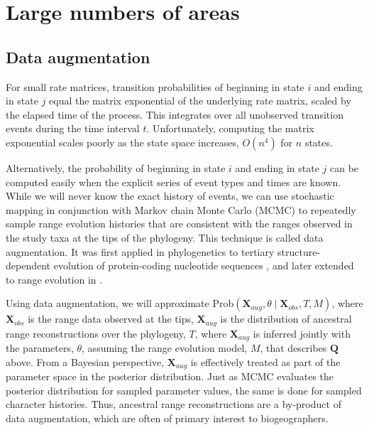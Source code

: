 \section{Large numbers of areas}
\label{sec:bayarea}

\setlength{\parindent}{0pt}

\subsection{Data augmentation}
\label{sec:data_aug}

For small rate matrices, transition probabilities of beginning in state $i$ and ending in state $j$ equal the matrix exponential of the underlying rate matrix, scaled by the elapsed time of the process.
This integrates over all unobserved transition events during the time interval $t$.
Unfortunately, computing the matrix exponential scales poorly as the state space increases, \IE $O(n^4)$ for $n$ states.

Alternatively, the probability of beginning in state $i$ and ending in state $j$ can be computed easily when the explicit series of event types and times are known.
While we will never know the exact history of events, we can use stochastic mapping in conjunction with Markov chain Monte Carlo (MCMC) to repeatedly sample range evolution histories that are consistent with the ranges observed in the study taxa at the tips of the phylogeny.
This technique is called data augmentation. It was first applied in phylogenetics to tertiary structure-dependent evolution of protein-coding nucleotide sequences \citep{Robinson2003}, and later extended to range evolution in \citet{Landis2013a}.

Using data augmentation, we will approximate {Prob$\left( \textbf{X}_{aug}, \theta \mid \textbf{X}_{obs}, T, M \right)$}, where $\textbf{X}_{obs}$ is the range data observed at the tips, $\textbf{X}_{aug}$ is the distribution of ancestral range reconstructions over the phylogeny, $T$, where $\textbf{X}_{aug}$ is inferred jointly with the parameters, $\theta$, assuming the range evolution model, $M$, that describes $\textbf{Q}$ above.
From a Bayesian perspective, $\textbf{X}_{aug}$ is effectively treated as part of the parameter space in the posterior distribution.
Just as MCMC evaluates the posterior distribution for sampled parameter values, the same is done for sampled character histories.
Thus, ancestral range reconstructions are a by-product of data augmentation, which are often of primary interest to biogeographers.


